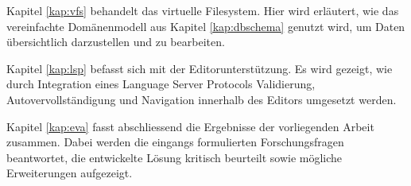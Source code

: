Kapitel \ref{kap:vfs}  behandelt das virtuelle Filesystem. Hier wird erläutert, wie das vereinfachte Domänenmodell aus Kapitel \ref{kap:dbschema} genutzt wird, um Daten übersichtlich darzustellen und zu bearbeiten.

Kapitel \ref{kap:lsp} befasst sich mit der Editorunterstützung. Es wird gezeigt, wie durch Integration eines Language Server Protocols Validierung, Autovervollständigung und Navigation innerhalb des Editors umgesetzt werden.

Kapitel \ref{kap:eva} fasst abschliessend die Ergebnisse der vorliegenden Arbeit zusammen. Dabei werden die eingangs formulierten Forschungsfragen beantwortet, die entwickelte Lösung kritisch beurteilt sowie mögliche Erweiterungen aufgezeigt.




